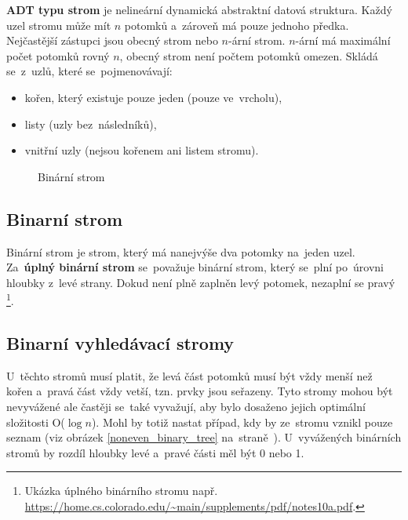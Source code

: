 \textbf{ADT typu strom} je nelineární dynamická abstraktní datová struktura. Každý uzel stromu může mít $n$ potomků a~zároveň má pouze jednoho předka. Nejčastější zástupci jsou obecný strom nebo $n$-ární strom. $n$-ární má maximální počet potomků rovný $n$, obecný strom není počtem potomků omezen. Skládá se~z~uzlů, které se~pojmenovávají:

\begin{itemize}
	\item kořen, který existuje pouze jeden (pouze ve~vrcholu),
	\item listy (uzly bez~následníků),
	\item vnitřní uzly (nejsou kořenem ani listem stromu).
\end{itemize}

\begin{figure}[ht]
	\centering
	\caption{Binární strom}
\end{figure}

\subsection{Binarní strom}

Binární strom je strom, který má nanejvýše dva potomky na~jeden uzel. Za~\textbf{úplný binární strom} se~považuje binární strom, který se~plní po~úrovni hloubky z~levé strany. Dokud není plně zaplněn levý potomek, nezaplní se pravý%
\footnote{Ukázka úplného binárního stromu např. \url{https://home.cs.colorado.edu/~main/supplements/pdf/notes10a.pdf}.}.

\subsection{Binarní vyhledávací stromy}

U~těchto stromů musí platit, že levá část potomků musí být vždy menší než kořen a~pravá část vždy vetší, tzn. prvky jsou seřazeny. Tyto stromy mohou být nevyvážené ale častěji se~také vyvažují, aby bylo dosaženo jejich optimální složitosti O($\log{n}$). Mohl by totiž nastat případ, kdy by ze~stromu vznikl pouze seznam (viz obrázek \ref{noneven_binary_tree} na~straně~\pageref{noneven_binary_tree}). U~vyvážených binárních stromů by rozdíl hloubky levé a~pravé části měl být 0 nebo 1.

